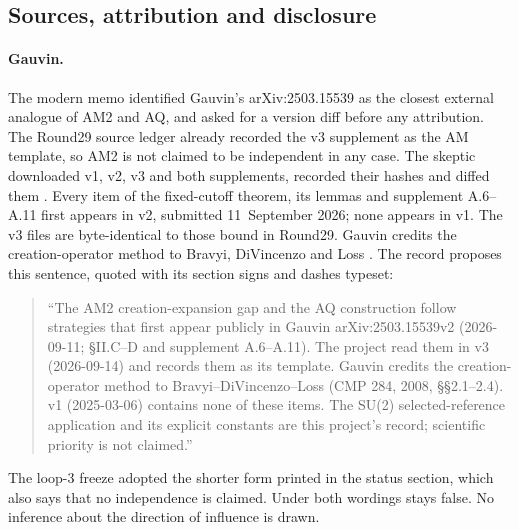 \subsection{Sources, attribution and disclosure}
\label{sec:history-sources}

\paragraph{Gauvin.}
The modern memo identified Gauvin's arXiv:2503.15539 \cite{gauvin} as the
closest external analogue of AM2 and AQ, and asked for a version diff before
any attribution. The Round29 source ledger already recorded the v3 supplement
as the AM template, so AM2 is not claimed to be independent in any case. The
skeptic downloaded v1, v2, v3 and both supplements, recorded their hashes and
diffed them \cite{r32gauvin}. Every item of the fixed-cutoff theorem, its
lemmas and supplement A.6--A.11 first appears in v2, submitted 11~September
2026; none appears in v1. The v3 files are byte-identical to those bound in
Round29. Gauvin credits the creation-operator method to Bravyi, DiVincenzo and
Loss \cite{bdl}. The record proposes this sentence, quoted with its section
signs and dashes typeset:
\begin{quote}\small
``The AM2 creation-expansion gap and the AQ construction follow strategies
that first appear publicly in Gauvin arXiv:2503.15539v2 (2026-09-11;
\S II.C--D and supplement A.6--A.11). The project read them in v3
(2026-09-14) and records them as its template. Gauvin credits the
creation-operator method to Bravyi--DiVincenzo--Loss (CMP 284, 2008,
\S\S2.1--2.4). v1 (2025-03-06) contains none of these items. The SU(2)
selected-reference application and its explicit constants are this project's
record; scientific priority is not claimed.''
\end{quote}
The loop-3 freeze adopted the shorter form printed in the status section,
which also says that no independence is claimed. Under both wordings
 stays false. No inference about the
direction of influence is drawn.

